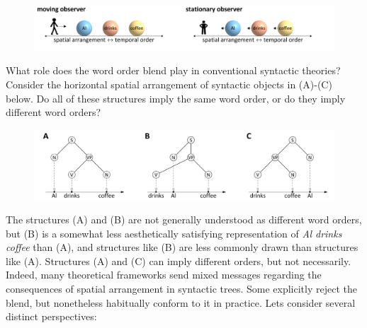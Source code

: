   
\begin{figure}
\includegraphics[width=\textwidth]{figures/Tilsen-img39.png}
\caption{\missingcaption}
\label{fig:}
\end{figure}
 

  What role does the word order blend play in conventional syntactic theories? Consider the horizontal spatial arrangement of syntactic objects in (A)-(C) below. Do all of these structures imply the same word order, or do they imply different word orders?

  
\begin{figure}
\includegraphics[width=\textwidth]{figures/Tilsen-img40.png}
\caption{\missingcaption}
\label{fig:}
\end{figure}
 

The structures (A) and (B) are not generally understood as different word orders, but (B) is a somewhat less aesthetically satisfying representation of \textit{Al drinks coffee} than (A), and structures like (B) are less commonly drawn than structures like (A). Structures (A) and (C) can imply different orders, but not necessarily. Indeed, many theoretical frameworks send mixed messages regarding the consequences of spatial arrangement in syntactic trees. Some explicitly reject the blend, but nonetheless habitually conform to it in practice. Lets consider several distinct perspectives:

